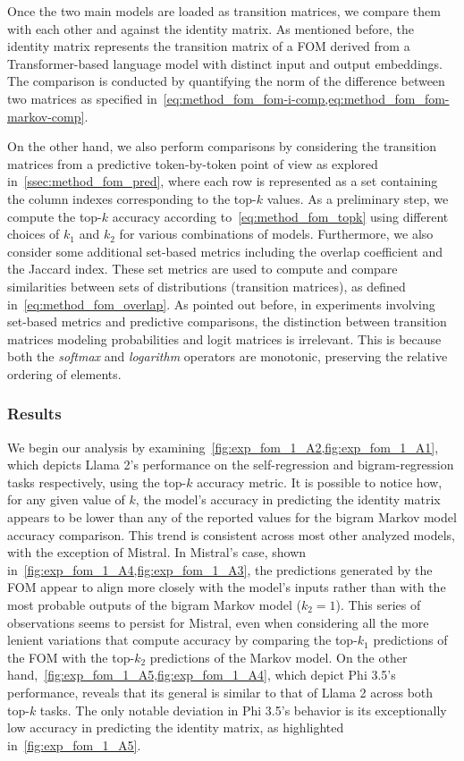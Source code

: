 Once the two main models are loaded as transition matrices, we compare them with each other and against the identity matrix.
As mentioned before, the identity matrix represents the transition matrix of a FOM derived from a Transformer-based language model with distinct input and output embeddings.
The comparison is conducted by quantifying the norm of the difference between two matrices as specified in~\cref{eq:method_fom_fom-i-comp,eq:method_fom_fom-markov-comp}.

On the other hand, we also perform comparisons by considering the transition matrices from a predictive token-by-token point of view as explored in~\cref{ssec:method_fom_pred}, where each row is represented as a set containing the column indexes corresponding to the top-$k$ values.
As a preliminary step, we compute the top-$k$ accuracy according to~\cref{eq:method_fom_topk} using different choices of $k_1$ and $k_2$ for various combinations of models.
Furthermore, we also consider some additional set-based metrics including the overlap coefficient and the Jaccard index.
These set metrics are used to compute and compare similarities between sets of distributions (transition matrices), as defined in~\cref{eq:method_fom_overlap}.
As pointed out before, in experiments involving set-based metrics and predictive comparisons, the distinction between transition matrices modeling probabilities and logit matrices is irrelevant.
This is because both the \emph{softmax} and \emph{logarithm} operators are monotonic, preserving the relative ordering of elements.

\subsubsection{Results}\label{sssec:exp_fom_exp1_results}

We begin our analysis by examining~\cref{fig:exp_fom_1_A2,fig:exp_fom_1_A1}, which depicts Llama 2's performance on the self-regression and bigram-regression tasks respectively, using the top-$k$ accuracy metric.
It is possible to notice how, for any given value of $k$, the model's accuracy in predicting the identity matrix appears to be lower than any of the reported values for the bigram Markov model accuracy comparison.
This trend is consistent across most other analyzed models, with the exception of Mistral.
In Mistral's case, shown in~\cref{fig:exp_fom_1_A4,fig:exp_fom_1_A3}, the predictions generated by the FOM appear to align more closely with the model's inputs rather than with the most probable outputs of the bigram Markov model ($k_2 = 1$).
This series of observations seems to persist for Mistral, even when considering all the more lenient variations that compute accuracy by comparing the top-$k_1$ predictions of the FOM with the top-$k_2$ predictions of the Markov model.
On the other hand,~\cref{fig:exp_fom_1_A5,fig:exp_fom_1_A4}, which depict Phi 3.5's performance, reveals that its general is similar to that of Llama 2 across both top-$k$ tasks.
The only notable deviation in Phi 3.5's behavior is its exceptionally low accuracy in predicting the identity matrix, as highlighted in~\cref{fig:exp_fom_1_A5}.

